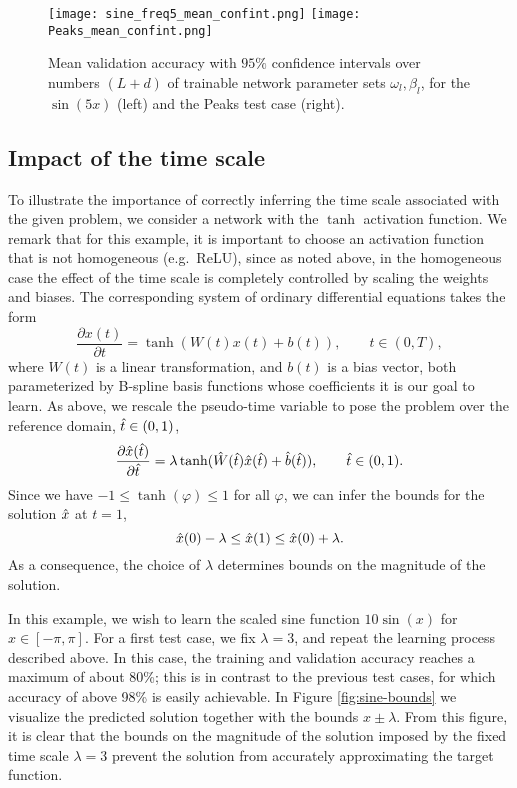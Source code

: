 \documentclass[12pt]{amsart}
\begin{document}
\begin{figure}
    \centering
    \texttt{[image: sine\_freq5\_mean\_confint.png]}
    \texttt{[image: Peaks\_mean\_confint.png]}
    \caption{Mean validation accuracy with $95\%$ confidence intervals over numbers $(L+d)$ of trainable network parameter sets $\omega_l, \beta_l$, for the $\sin(5x)$ (left) and the Peaks test case (right).}
    \label{fig:varyingL_mean}
\end{figure}

\subsection{Impact of the time scale}
\label{sec:impact-time-scale}

To illustrate the importance of correctly inferring the time scale associated with the given problem, we consider a network with the $\tanh$ activation function.
We remark that for this example, it is important to choose an activation function that is not homogeneous (e.g.\ ReLU), since as noted above, in the homogeneous case the effect of the time scale is completely controlled by scaling the weights and biases.
The corresponding system of ordinary differential equations takes the form
\[
  \frac{\partial x(t)}{\partial t} = \tanh(W(t)x(t) + b(t)), \qquad t \in (0,T),
\]
where $W(t)$ is a linear transformation, and $b(t)$ is a bias vector, both parameterized by B-spline basis functions whose coefficients it is our goal to learn.
As above, we rescale the pseudo-time variable to pose the problem over the reference domain, $\hat{t} \in (0,1)$,
\[
  \frac{\partial \hat{x}(\hat{t})}{\partial \hat{t}} = \lambda \tanh(\hat{W}(\hat{t})\hat{x}(\hat{t}) + \hat{b}(\hat{t})), \qquad \hat{t} \in (0,1).
\]
Since we have $-1 \leq \tanh(\varphi) \leq 1$ for all $\varphi$, we can infer the bounds for the solution $\hat{x}$ at $t=1$,
\[
  \hat{x}(0) - \lambda \leq \hat{x}(1) \leq \hat{x}(0) + \lambda.
\]
As a consequence, the choice of $\lambda$ determines bounds on the magnitude of the solution.

In this example, we wish to learn the scaled sine function $10 \sin(x)$ for $x \in [-\pi,\pi]$.
For a first test case, we fix $\lambda = 3$, and repeat the learning process described above.
In this case, the training and validation accuracy reaches a maximum of about 80\%; this is in contrast to the previous test cases, for which accuracy of above 98\% is easily achievable.
In Figure \ref{fig:sine-bounds} we visualize the predicted solution together with the bounds $x \pm \lambda$.
From this figure, it is clear that the bounds on the magnitude of the solution imposed by the fixed time scale $\lambda=3$ prevent the solution from accurately approximating the target function.
\end{document}
